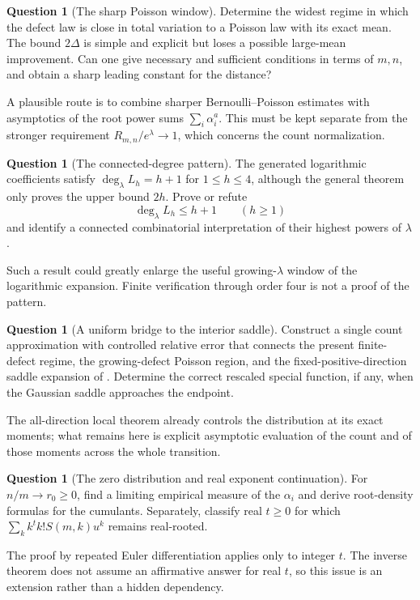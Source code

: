 \documentclass[11pt,letterpaper]{article}
\numberwithin{equation}{subsection}
\theoremstyle{definition}
\newtheorem{question}[theorem]{Question}
\theoremstyle{remark}
\theoremstyle{plain}
\begin{document}
\begin{question}[The sharp Poisson window]\label{a122:pd:q:poisson}
Determine the widest regime in which the defect law is close in total
variation to a Poisson law with its exact mean. The bound
$2\Delta$ is simple and explicit but loses a possible large-mean
improvement. Can one give necessary and sufficient conditions in terms
of $m,n$, and obtain a sharp leading constant for the distance?
\end{question}
A plausible route is to combine sharper Bernoulli--Poisson estimates with
asymptotics of the root power sums $\sum_i\alpha_i^a$. This must be
kept separate from the stronger requirement
$R_{m,n}/e^\lambda\to1$, which concerns the count normalization.

\begin{question}[The connected-degree pattern]\label{a122:pd:q:degree}
The generated logarithmic coefficients satisfy
$\deg_\lambda L_h=h+1$ for $1\le h\le4$, although the general theorem
only proves the upper bound $2h$. Prove or refute
\[
 \deg_\lambda L_h\le h+1\qquad(h\ge1)
\]
and identify a connected combinatorial interpretation of their highest
powers of $\lambda$.
\end{question}
Such a result could greatly enlarge the useful growing-$\lambda$
window of the logarithmic expansion. Finite verification through order
four is not a proof of the pattern.

\begin{question}[A uniform bridge to the interior saddle]\label{a122:pd:q:bridge}
Construct a single count approximation with controlled relative error
that connects the present finite-defect regime, the growing-defect
Poisson region, and the fixed-positive-direction saddle expansion of
\cite{a122:pd:repo}. Determine the correct rescaled special function, if any,
when the Gaussian saddle approaches the endpoint.
\end{question}
The all-direction local theorem already controls the distribution at its
exact moments; what remains here is explicit asymptotic evaluation of
the count and of those moments across the whole transition.

\begin{question}[The zero distribution and real exponent continuation]\label{a122:pd:q:zeros}
For $n/m\to r_0\ge0$, find a limiting empirical measure of the
$\alpha_i$ and derive root-density formulas for the cumulants.
Separately, classify real $t\ge0$ for which
$\sum_k k^t k!S(m,k)u^k$ remains real-rooted.
\end{question}
The proof by repeated Euler differentiation applies only to integer
$t$. The inverse theorem does not assume an affirmative answer for real
$t$, so this issue is an extension rather than a hidden dependency.
\end{document}
